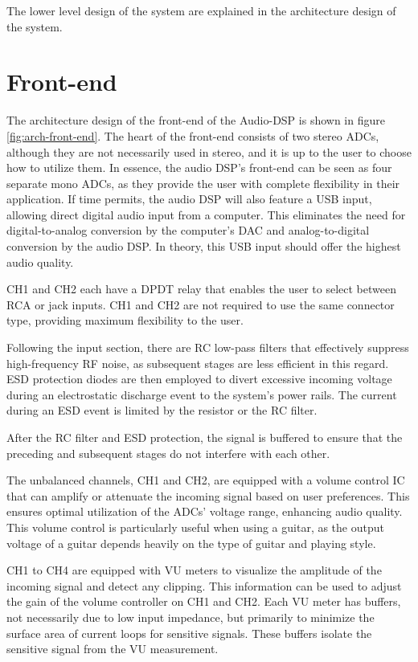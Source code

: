The lower level design of the system are explained in the architecture design of the system. 

\section{Front-end}
The architecture design of the front-end of the Audio-DSP is shown in figure \ref{fig:arch-front-end}. The heart of the front-end consists of two stereo ADCs, although they are not necessarily used in stereo, and it is up to the user to choose how to utilize them. In essence, the audio DSP's front-end can be seen as four separate mono ADCs, as they provide the user with complete flexibility in their application. If time permits, the audio DSP will also feature a USB input, allowing direct digital audio input from a computer. This eliminates the need for digital-to-analog conversion by the computer's DAC and analog-to-digital conversion by the audio DSP. In theory, this USB input should offer the highest audio quality.

CH1 and CH2 each have a DPDT relay that enables the user to select between RCA or jack inputs. CH1 and CH2 are not required to use the same connector type, providing maximum flexibility to the user.

Following the input section, there are RC low-pass filters that effectively suppress high-frequency RF noise, as subsequent stages are less efficient in this regard. ESD protection diodes are then employed to divert excessive incoming voltage during an electrostatic discharge event to the system's power rails. The current during an ESD event is limited by the resistor or the RC filter.

After the RC filter and ESD protection, the signal is buffered to ensure that the preceding and subsequent stages do not interfere with each other.

The unbalanced channels, CH1 and CH2, are equipped with a volume control IC that can amplify or attenuate the incoming signal based on user preferences. This ensures optimal utilization of the ADCs' voltage range, enhancing audio quality. This volume control is particularly useful when using a guitar, as the output voltage of a guitar depends heavily on the type of guitar and playing style.

CH1 to CH4 are equipped with VU meters to visualize the amplitude of the incoming signal and detect any clipping. This information can be used to adjust the gain of the volume controller on CH1 and CH2. Each VU meter has buffers, not necessarily due to low input impedance, but primarily to minimize the surface area of current loops for sensitive signals. These buffers isolate the sensitive signal from the VU measurement.

